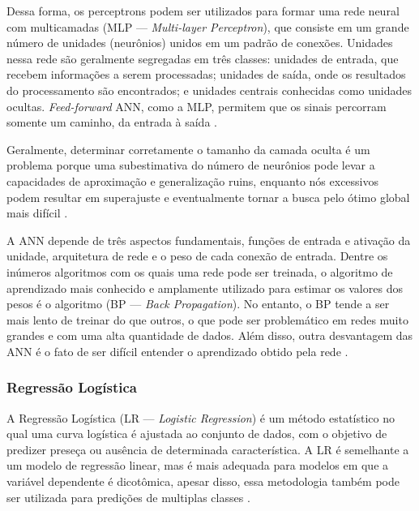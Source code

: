 \documentclass[
	12pt,				%
	oneside,			%
	a4paper,			%
	english,			%
	brazil				%
	]{abntex2ppgsi}
\begin{document}
{Dessa forma, os perceptrons podem ser utilizados para formar uma rede neural com multicamadas (MLP --- \textit{Multi-layer Perceptron}), que consiste em um grande número de unidades (neurônios) unidos em um padrão de conexões. Unidades nessa rede são geralmente segregadas em três classes: unidades de entrada, que recebem informações a serem processadas; unidades de saída, onde os resultados do processamento são encontrados; e unidades centrais conhecidas como unidades ocultas. \textit{Feed-forward} ANN, como a MLP, permitem que os sinais percorram somente um caminho, da entrada à saída  \cite{kotsiantis2006machine}.

Geralmente, determinar corretamente o tamanho da camada oculta é um problema porque uma subestimativa do número de neurônios pode levar a capacidades de aproximação e generalização ruins, enquanto nós excessivos podem resultar em superajuste e eventualmente tornar a busca pelo ótimo global mais difícil  \cite{kotsiantis2006machine}.

A ANN depende de três aspectos fundamentais, funções de entrada e ativação da unidade, arquitetura de rede e o peso de cada conexão de entrada. Dentre os inúmeros  algoritmos com os quais uma rede pode ser treinada, o algoritmo de aprendizado mais conhecido e amplamente utilizado para estimar os valores dos pesos é o algoritmo (BP --- \textit{Back Propagation}). No entanto, o BP tende a ser mais lento de treinar do que outros, o que pode ser problemático em redes muito grandes e com uma alta quantidade de dados. Além disso, outra desvantagem das ANN é o fato de ser difícil entender o aprendizado obtido pela rede \cite{kotsiantis2006machine, singh2016review}.

\subsubsection{Regressão Logística}

A Regressão Logística  (LR --- \textit{Logistic Regression}) é um método estatístico no qual uma curva logística é ajustada ao conjunto de dados, com o objetivo de predizer preseça ou ausência de determinada característica. A LR é semelhante a um modelo de regressão linear, mas é mais adequada para modelos em que a variável dependente é dicotômica, apesar disso, essa metodologia também pode ser utilizada para predições de multiplas classes \cite{schein2007active, kurt2008comparing, singh2016review}. 

}
\end{document}
